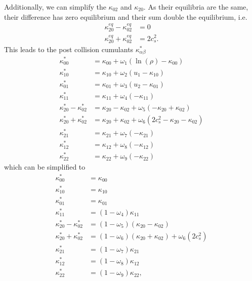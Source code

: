 Additionally, we can simplify the $\kappa_{02}$ and $\kappa_{20}$.
As their equilibria are the same, their difference has zero equilibrium and their sum double the equilibrium, i.e.
\begin{equation}
  \begin{aligned}
    \kappa_{20}^{eq} - \kappa_{02}^{eq} & = 0  \\
    \kappa_{20}^{eq} + \kappa_{02}^{eq} & = 2 c_s^2.
  \end{aligned}
\end{equation}
%
This leads to the post collision cumulants $\kappa_{\alpha\beta}^*$
\begin{equation}
  \label{eq: post equilibrium cumulants}
  \begin{aligned}
    \kappa_{00}^{*} & = \kappa_{00} + \omega_1 \left( \ln(\rho) - \kappa_{00} \right) \\
    \kappa_{10}^{*} & = \kappa_{10} + \omega_2 \left( u_1 - \kappa_{10} \right) \\
    \kappa_{01}^{*} & = \kappa_{01} + \omega_3 \left( u_2 - \kappa_{01} \right) \\
    \kappa_{11}^{*} & = \kappa_{11} + \omega_4 \left( - \kappa_{11} \right) \\
    \kappa_{20}^{*} - \kappa_{02}^{*}
      & = \kappa_{20} - \kappa_{02} + \omega_5 \left( - \kappa_{20} + \kappa_{02} \right) \\
    \kappa_{20}^{*} + \kappa_{02}^{*}
      & = \kappa_{20} + \kappa_{02} + \omega_6 \left( 2 c_s^2 - \kappa_{20} - \kappa_{02} \right) \\
    \kappa_{21}^{*} & = \kappa_{21} + \omega_7 \left( - \kappa_{21} \right) \\
    \kappa_{12}^{*} & = \kappa_{12} + \omega_8 \left( - \kappa_{12} \right) \\
    \kappa_{22}^{*} & = \kappa_{22} + \omega_9 \left( - \kappa_{22} \right)
  \end{aligned}
\end{equation}
which can be simplified to
\begin{equation}
  \begin{aligned}
    \kappa_{00}^{*} & = \kappa_{00} \\
    \kappa_{10}^{*} & = \kappa_{10} \\
    \kappa_{01}^{*} & = \kappa_{01} \\
    \kappa_{11}^{*} & = (1-\omega_4)\kappa_{11} \\
    \kappa_{20}^{*} - \kappa_{02}^{*}
      & = (1-\omega_5) (\kappa_{20} - \kappa_{02}) \\
    \kappa_{20}^{*} + \kappa_{02}^{*}
      & = (1-\omega_6)(\kappa_{20} + \kappa_{02}) + \omega_6 \left( 2 c_s^2 \right) \\
    \kappa_{21}^{*} & = (1-\omega_7)\kappa_{21} \\
    \kappa_{12}^{*} & = (1-\omega_8)\kappa_{12} \\
    \kappa_{22}^{*} & = (1-\omega_9)\kappa_{22},
  \end{aligned}
\end{equation}
